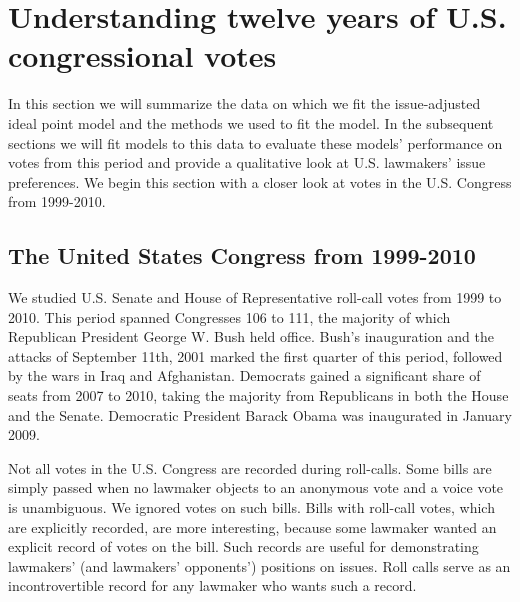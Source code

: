         

\section{Understanding twelve years of U.S. congressional votes}
\label{sec:empirical_analysis}

In this section we will summarize the data on which we fit the
issue-adjusted ideal point model and the methods we used to fit the
model. In the subsequent sections we will fit models to this data to
evaluate these models' performance on votes from this period and
provide a qualitative look at U.S. lawmakers' issue preferences. We
begin this section with a closer look at votes in the U.S. Congress
from 1999-2010.

\subsection*{The United States Congress from 1999-2010}
We studied U.S. Senate and House of Representative roll-call votes
from 1999 to 2010.  This period spanned Congresses 106 to 111, the
majority of which Republican President George W. Bush held office.
Bush's inauguration and the attacks of September 11th, 2001 marked the
first quarter of this period, followed by the wars in Iraq and
Afghanistan.  Democrats gained a significant share of seats from 2007
to 2010, taking the majority from Republicans in both the House and
the Senate. Democratic President Barack Obama was inaugurated in
January 2009.


Not all votes in the U.S. Congress are recorded during roll-calls.
Some bills are simply passed when no lawmaker objects to an anonymous
vote and a voice vote is unambiguous.  We ignored votes on such bills.
Bills with roll-call votes, which are explicitly recorded, are more
interesting, because some lawmaker wanted an explicit record of votes
on the bill. Such records are useful for demonstrating lawmakers' (and
lawmakers' opponents') positions on issues.  Roll calls serve as an
incontrovertible record for any lawmaker who wants such a record.

